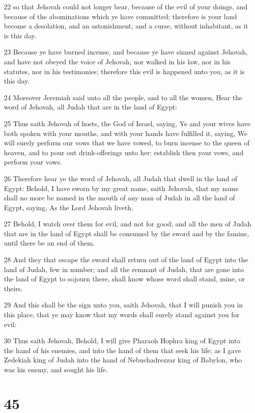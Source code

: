 \par 22 so that Jehovah could not longer bear, because of the evil of your doings, and because of the abominations which ye have committed; therefore is your land become a desolation, and an astonishment, and a curse, without inhabitant, as it is this day.
\par 23 Because ye have burned incense, and because ye have sinned against Jehovah, and have not obeyed the voice of Jehovah, nor walked in his law, nor in his statutes, nor in his testimonies; therefore this evil is happened unto you, as it is this day.
\par 24 Moreover Jeremiah said unto all the people, and to all the women, Hear the word of Jehovah, all Judah that are in the land of Egypt:
\par 25 Thus saith Jehovah of hosts, the God of Israel, saying, Ye and your wives have both spoken with your mouths, and with your hands have fulfilled it, saying, We will surely perform our vows that we have vowed, to burn incense to the queen of heaven, and to pour out drink-offerings unto her: establish then your vows, and perform your vows.
\par 26 Therefore hear ye the word of Jehovah, all Judah that dwell in the land of Egypt: Behold, I have sworn by my great name, saith Jehovah, that my name shall no more be named in the mouth of any man of Judah in all the land of Egypt, saying, As the Lord Jehovah liveth.
\par 27 Behold, I watch over them for evil, and not for good; and all the men of Judah that are in the land of Egypt shall be consumed by the sword and by the famine, until there be an end of them.
\par 28 And they that escape the sword shall return out of the land of Egypt into the land of Judah, few in number; and all the remnant of Judah, that are gone into the land of Egypt to sojourn there, shall know whose word shall stand, mine, or theirs.
\par 29 And this shall be the sign unto you, saith Jehovah, that I will punish you in this place, that ye may know that my words shall surely stand against you for evil:
\par 30 Thus saith Jehovah, Behold, I will give Pharaoh Hophra king of Egypt into the hand of his enemies, and into the hand of them that seek his life; as I gave Zedekiah king of Judah into the hand of Nebuchadrezzar king of Babylon, who was his enemy, and sought his life.

\chapter{45}

